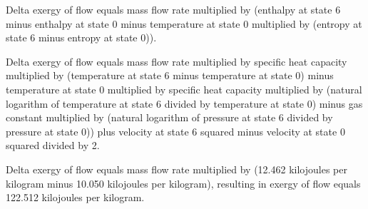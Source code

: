 Delta exergy of flow equals mass flow rate multiplied by (enthalpy at state 6 minus enthalpy at state 0 minus temperature at state 0 multiplied by (entropy at state 6 minus entropy at state 0)).  

Delta exergy of flow equals mass flow rate multiplied by specific heat capacity multiplied by (temperature at state 6 minus temperature at state 0) minus temperature at state 0 multiplied by specific heat capacity multiplied by (natural logarithm of temperature at state 6 divided by temperature at state 0) minus gas constant multiplied by (natural logarithm of pressure at state 6 divided by pressure at state 0)) plus velocity at state 6 squared minus velocity at state 0 squared divided by 2.  

Delta exergy of flow equals mass flow rate multiplied by (12.462 kilojoules per kilogram minus 10.050 kilojoules per kilogram), resulting in exergy of flow equals 122.512 kilojoules per kilogram.